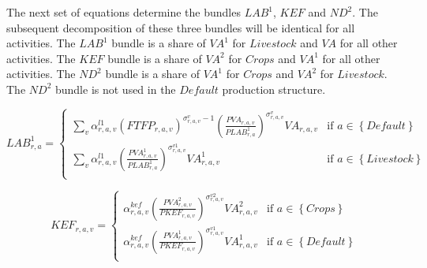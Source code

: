\documentclass[11pt,letterpaper]{report}
\begin{document}
The next set of equations determine the bundles $\mathit{LAB}^1$, $\mathit{KEF}$
and $\mathit{ND}^2$. The subsequent decomposition of these three bundles will be
identical for all activities. The $\mathit{LAB}^1$ bundle is a share of
$\mathit{VA}^1$ for $\mathit{Livestock}$ and $\mathit{VA}$ for all other
activities. The $\mathit{KEF}$ bundle is a share of $\mathit{VA}^2$ for
$\mathit{Crops}$ and $\mathit{VA}^1$ for all other activities. The
$\mathit{ND}^2$ bundle is a share of $\mathit{VA}^1$ for $\mathit{Crops}$ and
$\mathit{VA}^2$ for $\mathit{Livestock}$. The $\mathit{ND}^2$ bundle is not used
in the $\mathit{Default}$ production structure.

\begin{equation}
\label{eq:lab1}
\mathit{LAB}^1_{r,a} =
\begin{cases}
   \displaystyle \sum_v{
         \alpha^{\mathit{l1}}_{r,a,v}
         \left(\mathit{FTFP}_{r,a,v} \right)^{\sigma^{v}_{r,a,v}-1}
         \left( \frac{\mathit{PVA}_{r,a,v}} {\mathit{PLAB}^1_{r,a}}
         \right)^{\sigma^{v}_{r,a,v}}
         \mathit{VA}_{r,a,v}
      }
   & \textrm{if } a \in \left\{ \mathit{Default} \right\} \\
   \displaystyle \sum_v{
         \alpha^{\mathit{l1}}_{r,a,v}
         \left( \frac{\mathit{PVA}^1_{r,a,v}} {\mathit{PLAB}^1_{r,a}}
         \right)^{\sigma^{v1}_{r,a,v}}
         \mathit{VA}^1_{r,a,v}
      }
   & \textrm{if } a \in \left\{ \mathit{Livestock} \right\} \\
\end{cases}
\end{equation}

\begin{equation}
\label{eq:kef}
\mathit{KEF}_{r,a,v} =
\begin{cases}
   \displaystyle
      \alpha^{\mathit{kef}}_{r,a,v}
      \left( \frac{\mathit{PVA}^2_{r,a,v}} {\mathit{PKEF}_{r,a,v}}
      \right)^{\sigma^{v2}_{r,a,v}}
      \mathit{VA}^2_{r,a,v}
   & \textrm{if } a \in \left\{ \mathit{Crops} \right\} \\
   \displaystyle
      \alpha^{\mathit{kef}}_{r,a,v}
      \left( \frac{\mathit{PVA}^1_{r,a,v}} {\mathit{PKEF}_{r,a,v}}
      \right)^{\sigma^{v1}_{r,a,v}}
      \mathit{VA}^1_{r,a,v}
   & \textrm{if } a \in \left\{ \mathit{Default} \right\} \\
\end{cases}
\end{equation}
\end{document}
